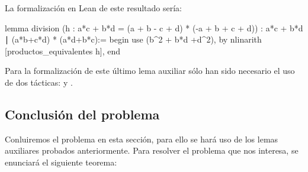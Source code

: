 La formalización en Lean de este resultado sería:
\begin{leancode}
lemma division
  (h : a*c + b*d = (a + b - c + d) * (-a + b + c + d))
  : a*c + b*d ∣ (a*b+c*d) * (a*d+b*c):=
begin
  use (b^2 + b*d +d^2),
  by nlinarith [productos_equivalentes h],
end
\end{leancode}

Para la formalización de este último lema auxiliar sólo han sido necesario el
uso de dos tácticas:  y .

\subsection{Conclusión del problema}

Conluiremos el problema en esta sección, para ello se hará uso de los
lemas auxiliares probados anteriormente. Para resolver el problema que
nos interesa, se enunciará el siguiente teorema:

